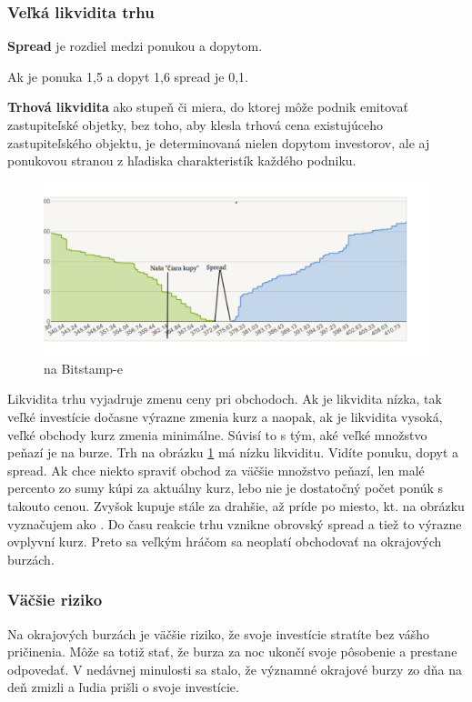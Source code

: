 \subsubsection{Veľká likvidita trhu} 
\begin{mydef} 
{\bf Spread}\cite{ZAC} je rozdiel medzi ponukou a dopytom.
\end{mydef} 
Ak je ponuka 1,5 a dopyt 1,6 spread je 0,1.
\begin{mydef} 
{\bf Trhová likvidita}\cite{revzvnakova2007mezinarodni} ako stupeň či miera, do ktorej môže podnik emitovať zastupiteľské objetky, bez toho, aby klesla trhová cena existujúceho zastupiteľského objektu, je determinovaná nielen dopytom investorov, ale aj ponukovou stranou z hľadiska charakteristík každého podniku. 
\end{mydef}
\begin{figure}[!hbt] 
\begin{center} 
\includegraphics[width=1\textwidth]{stamp} 
\caption{ na Bitstamp-e} 
\label{img:ob} 
\end{center} 
\end{figure} 
  Likvidita trhu vyjadruje zmenu ceny pri obchodoch. Ak je likvidita nízka, tak veľké investície dočasne výrazne zmenia kurz a naopak, ak je likvidita vysoká, veľké obchody kurz zmenia minimálne. Súvisí to s tým, aké veľké množstvo peňazí je na burze. Trh na obrázku \ref{img:ob} má nízku likviditu. Vidíte ponuku, dopyt a spread. Ak chce niekto spraviť obchod za väčšie množstvo peňazí, len malé percento zo sumy kúpi za aktuálny kurz, lebo nie je dostatočný počet ponúk s takouto cenou. Zvyšok kupuje stále za drahšie, až príde po miesto, kt. na obrázku vyznačujem ako . Do času reakcie trhu vznikne obrovský spread a tiež to výrazne ovplyvní kurz. Preto sa veľkým hráčom sa neoplatí obchodovať na okrajových burzách. 
\subsubsection{Väčšie riziko} 
Na okrajových burzách je väčšie riziko, že svoje investície stratíte bez vášho pričinenia. Môže sa totiž stať, že burza za noc ukončí svoje pôsobenie a prestane odpovedať. V nedávnej minulosti sa stalo, že významné okrajové burzy zo dňa na deň zmizli a ľudia prišli o svoje investície.  
